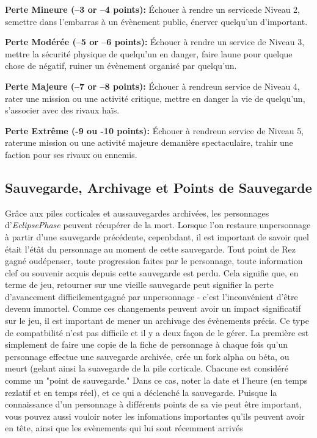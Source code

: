 \textbf{Perte Mineure (–3 or –4 points):} Échouer à rendre un servicede Niveau 2, semettre dans l'embarras à un évènement public, énerver quelqu'un d'important. 

\textbf{Perte Modérée (–5 or –6 points):} Échouer à rendre un service de Niveau 3, mettre la sécurité physique de quelqu'un en danger, faire laune pour quelque chose de négatif, ruiner un évènement organisé par quelqu'un. 

\textbf{Perte Majeure (–7 or –8 points):} Échouer à rendreun service de Niveau 4, rater une mission ou une activité critique, mettre en danger la vie de quelqu'un, s'associer avec des rivaux haïs. 

\textbf{Perte Extrême (-9 ou -10 points): } Échouer à rendreun service de Niveau 5, raterune mission ou une activité majeure demanière spectaculaire, trahir une faction pour ses rivaux ou ennemis. 

\subsection{Sauvegarde, Archivage et Points de Sauvegarde} 

Grâce aux piles corticales et aussauvegardes archivées, les personnages d'\textit{EclipsePhase} peuvent récupérer de la mort. Lorsque l'on restaure unpersonnage à partir d'une sauvegarde précédente, cepenbdant, il est important de savoir quel était l'étât du personnage au moment de cette sauvegarde. Tout point de Rez gagné oudépenser, toute progression faites par le personnage, toute information clef ou souvenir acquis depuis cette sauvegarde est perdu. Cela signifie que, en terme de jeu, retourner sur une vieille sauvegarde peut signifier la perte d'avancement difficilementgagné par unpersonnage - c'est l'inconvénient d'être devenu immortel. Comme ces changements peuvent avoir un impact significatif sur le jeu, il est important de mener un archivage des évènements précis. Ce type de compatbilité n'est pas difficile et il y a deux façon de le gérer. La première est simplement de faire une copie de la fiche de personnage à chaque fois qu'un personnage effectue une sauvegarde archivée, crée un fork alpha ou béta, ou meurt (gelant ainsi la suavegarde de la pile corticale. Chacune est considéré comme un "point de sauvegarde." Dans ce cas, noter la date et l'heure (en temps rezlatif et en temps réel), et ce qui a déclenché la sauvegarde. Puisque la connaissance d'un personnage à différents points de sa vie peut être important, vous pouvez aussi vouloir noter les infomations importantes qu'ils peuvent avoir en tête, ainsi que les evènements qui lui sont récemment arrivés 

